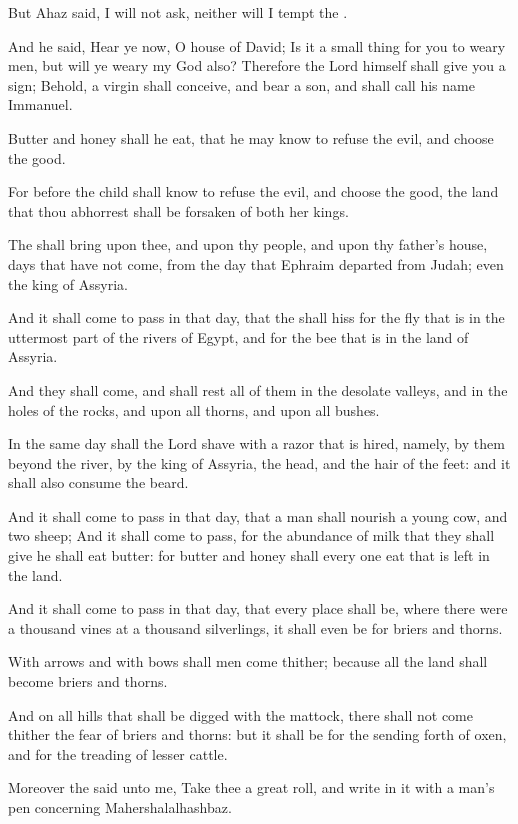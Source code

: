 \Verse But Ahaz said, I will not ask, neither will I tempt the \LORD.

\Verse And he said, Hear ye now, O house of David; Is it a small thing for you to weary men, but will ye weary my God also?  \Verse Therefore the Lord himself shall give you a sign; Behold, a virgin shall conceive, and bear a son, and shall call his name Immanuel.

\Verse Butter and honey shall he eat, that he may know to refuse the evil, and choose the good.

\Verse For before the child shall know to refuse the evil, and choose the good, the land that thou abhorrest shall be forsaken of both her kings.

\Verse The \LORD shall bring upon thee, and upon thy people, and upon thy father's house, days that have not come, from the day that Ephraim departed from Judah; even the king of Assyria.

\Verse And it shall come to pass in that day, that the \LORD shall hiss for the fly that is in the uttermost part of the rivers of Egypt, and for the bee that is in the land of Assyria.

\Verse And they shall come, and shall rest all of them in the desolate valleys, and in the holes of the rocks, and upon all thorns, and upon all bushes.

\Verse In the same day shall the Lord shave with a razor that is hired, namely, by them beyond the river, by the king of Assyria, the head, and the hair of the feet: and it shall also consume the beard.

\Verse And it shall come to pass in that day, that a man shall nourish a young cow, and two sheep; \Verse And it shall come to pass, for the abundance of milk that they shall give he shall eat butter: for butter and honey shall every one eat that is left in the land.

\Verse And it shall come to pass in that day, that every place shall be, where there were a thousand vines at a thousand silverlings, it shall even be for briers and thorns.

\Verse With arrows and with bows shall men come thither; because all the land shall become briers and thorns.

\Verse And on all hills that shall be digged with the mattock, there shall not come thither the fear of briers and thorns: but it shall be for the sending forth of oxen, and for the treading of lesser cattle.


\Chapter
\Verse Moreover the \LORD said unto me, Take thee a great roll, and write in it with a man's pen concerning Mahershalalhashbaz.

